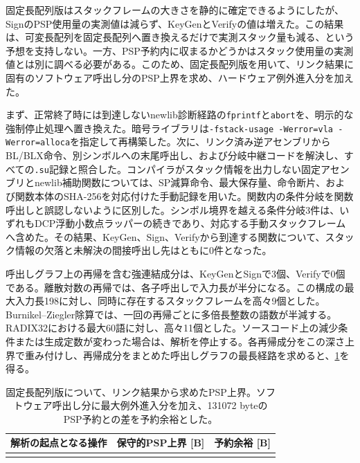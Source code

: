 \documentclass[a4paper,10pt]{ltjsarticle}
\theoremstyle{definition}
\theoremstyle{remark}
\begin{document}
固定長配列版はスタックフレームの大きさを静的に確定できるようにしたが、SignのPSP使用量の実測値は減らず、KeyGenとVerifyの値は増えた。この結果は、可変長配列を固定長配列へ置き換えるだけで実測スタック量も減る、という予想を支持しない。一方、PSP予約内に収まるかどうかはスタック使用量の実測値とは別に調べる必要がある。このため、固定長配列版を用いて、リンク結果に固有のソフトウェア呼出し分のPSP上界を求め、ハードウェア例外進入分を加えた。

まず、正常終了時には到達しないnewlib診断経路の\texttt{fprintf}と\texttt{abort}を、明示的な強制停止処理へ置き換えた。暗号ライブラリは\texttt{-fstack-usage -Werror=vla -Werror=alloca}を指定して再構築した。次に、リンク済み逆アセンブリからBL/BLX命令、別シンボルへの末尾呼出し、および分岐中継コードを解決し、すべての\texttt{.su}記録と照合した。コンパイラがスタック情報を出力しない固定アセンブリとnewlib補助関数については、SP減算命令、最大保存量、命令断片、および関数本体のSHA-256を対応付けた手動記録を用いた。関数内の条件分岐を関数呼出しと誤認しないように区別した。シンボル境界を越える条件分岐3件は、いずれもDCP浮動小数点ラッパーの続きであり、対応する手動スタックフレームへ含めた。その結果、KeyGen、Sign、Verifyから到達する関数について、スタック情報の欠落と未解決の間接呼出し先はともに0件となった。

呼出しグラフ上の再帰を含む強連結成分は、KeyGenとSignで3個、Verifyで0個である。離散対数の再帰では、各子呼出しで入力長が半分になる。この構成の最大入力長198に対し、同時に存在するスタックフレームを高々9個とした。Burnikel--Ziegler除算では、一回の再帰ごとに多倍長整数の語数が半減する。RADIX32における最大60語に対し、高々11個とした。ソースコード上の減少条件または生成定数が変わった場合は、解析を停止する。各再帰成分をこの深さ上界で重み付けし、再帰成分をまとめた呼出しグラフの最長経路を求めると、\cref{tab:v3-static-psp-bound}を得る。

\begin{table}[H]
  \centering
  \caption{固定長配列版について、リンク結果から求めたPSP上界。ソフトウェア呼出し分に最大例外進入分を加え、\num{131072} byteのPSP予約との差を予約余裕とした。}
  \label{tab:v3-static-psp-bound}
  \small
  \begin{tabular}{@{}lrr@{}}
    \toprule
    解析の起点となる操作 & 保守的PSP上界 [B] & 予約余裕 [B] \\
    \midrule
    \\
    \bottomrule
  \end{tabular}
\end{table}
\end{document}
